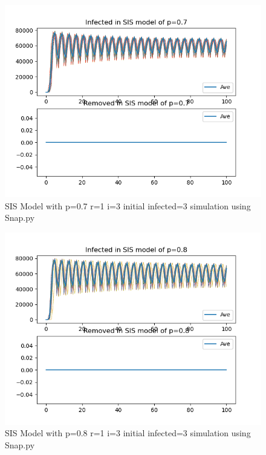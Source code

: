 \documentclass{subfile}
\begin{document}
  \begin{figure}
  \includegraphics[scale=0.8]{sisp07r1i3s3}
  \caption[SIS p=0.7,r=1,i=3,init infected=3]{SIS Model with p=0.7 r=1 i=3 initial infected=3 simulation using Snap.py}
  \end{figure}
  \begin{figure}
  \includegraphics[scale=0.8]{sisp08r1i3s3}
  \caption[SIS p=0.8,r=1,i=3,init infected=3]{SIS Model with p=0.8 r=1 i=3 initial infected=3 simulation using Snap.py}
  \end{figure}
\end{document}
